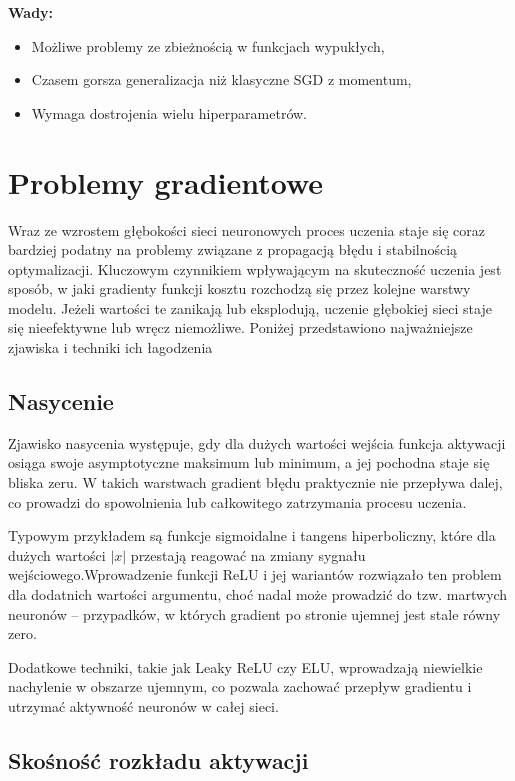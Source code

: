 \textbf{Wady:}
\begin{itemize}
	\item Możliwe problemy ze zbieżnością w funkcjach wypukłych,
	\item Czasem gorsza generalizacja niż klasyczne SGD z momentum,
	\item Wymaga dostrojenia wielu hiperparametrów.
\end{itemize}

\cite{kingma2015adam}

\section{Problemy gradientowe}

Wraz ze wzrostem głębokości sieci neuronowych proces uczenia staje się coraz bardziej podatny na problemy związane z propagacją błędu i stabilnością optymalizacji. Kluczowym czynnikiem wpływającym na skuteczność uczenia jest sposób, w jaki gradienty funkcji kosztu rozchodzą się przez kolejne warstwy modelu. Jeżeli wartości te zanikają lub eksplodują, uczenie głębokiej sieci staje się nieefektywne lub wręcz niemożliwe. Poniżej przedstawiono najważniejsze zjawiska i techniki ich łagodzenia

\subsection*{Nasycenie}

Zjawisko nasycenia występuje, gdy dla dużych wartości wejścia funkcja aktywacji osiąga swoje asymptotyczne maksimum lub minimum, a jej pochodna staje się bliska zeru. W takich warstwach gradient błędu praktycznie nie przepływa dalej, co prowadzi do spowolnienia lub całkowitego zatrzymania procesu uczenia.

Typowym przykładem są funkcje sigmoidalne i tangens hiperboliczny, które dla dużych wartości $|x|$ przestają reagować na zmiany sygnału wejściowego.Wprowadzenie funkcji ReLU i jej wariantów rozwiązało ten problem dla dodatnich wartości argumentu, choć nadal może prowadzić do tzw. martwych neuronów – przypadków, w których gradient po stronie ujemnej jest stale równy zero.

Dodatkowe techniki, takie jak Leaky ReLU czy ELU, wprowadzają niewielkie nachylenie w obszarze ujemnym, co pozwala zachować przepływ gradientu i utrzymać aktywność neuronów w całej sieci.

\subsection*{Skośność rozkładu aktywacji}

